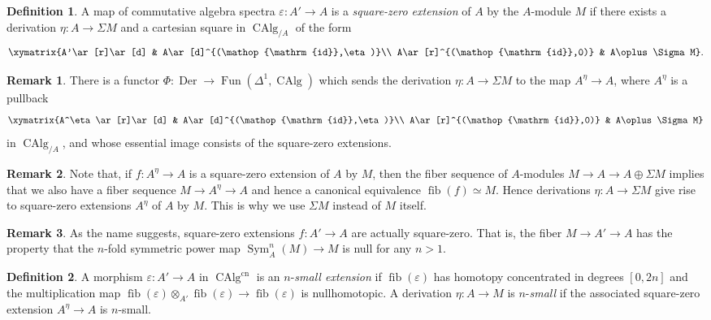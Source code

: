 \documentclass{article}
\theoremstyle{definition}
\newtheorem{definition}{Definition}[subsection]
\newtheorem{remark}{Remark}[subsection]
\DeclareMathOperator{\CAlg}{CAlg}
\DeclareMathOperator{\Der}{Der}
\DeclareMathOperator{\Fun}{Fun}
\DeclareMathOperator{\id}{id}
\DeclareMathOperator{\Sym}{Sym}
\DeclareMathOperator{\fib}{fib}
\newcommand{\cn}{\mathrm{cn}}
\renewcommand{\epsilon}{\varepsilon}
\begin{document}
\begin{definition}
A map of  commutative algebra spectra $\epsilon:A'\to A$ is a {\em square-zero extension}
of $A$ by the $A$-module $M$ if there exists a derivation $\eta:A\to\Sigma M$ and a cartesian square in $\CAlg_{/A}$ of the form
\[
\xymatrix{A'\ar[r]\ar[d] & A\ar[d]^{(\id,\eta)}\\
A\ar[r]^{(\id,0)} & A\oplus \Sigma M}.
\]
\end{definition}
\begin{remark}\label{Phi}
There is a functor $\Phi:\Der\to\Fun(\Delta^1,\CAlg)$
\index{$\Phi$}
which sends the derivation $\eta:A\to\Sigma M$ to the map $A^\eta\to A$, where $A^\eta$ is a pullback
\[
\xymatrix{A^\eta\ar[r]\ar[d] & A\ar[d]^{(\id,\eta)}\\
A\ar[r]^{(\id,0)} & A\oplus \Sigma M} 
\]
in $\CAlg_{/A}$,
and whose essential image consists of the square-zero extensions.
\end{remark}



\begin{remark}
Note that, if $f:A^\eta\to A$ is a square-zero extension of $A$ by $M$, then the fiber sequence of $A$-modules $M\to A\to A\oplus\Sigma M$ implies that we also have a fiber sequence $M\to A^\eta\to A$ and hence a canonical equivalence $\fib(f)\simeq M$.
Hence derivations $\eta:A\to\Sigma M$ give rise to square-zero extensions $A^\eta$ of $A$ by $M$.
This is why we use $\Sigma M$ instead of $M$ itself.
\end{remark}



\begin{remark}
As the name suggests, square-zero extensions $f:A'\to A$ are actually square-zero.
That is, the fiber $M\to A'\to A$ has the property that the $n$-fold symmetric power map $\Sym_A^n(M)\to M$ is null for any $n>1$.
\end{remark}

\begin{definition}
A morphism $\epsilon:A'\to A$ in $\CAlg^{\cn}$ is an $n$-{\em small extension}
if $\fib(\epsilon)$ has homotopy concentrated in degrees $[0,2n]$ and the multiplication map $\fib(\epsilon)\otimes_{A'}\fib(\epsilon)\to\fib(\epsilon)$ is nullhomotopic.
A derivation $\eta:A\to M$ is $n$-{\em small} if the associated square-zero extension $A^\eta\to A$ is $n$-small.
\end{definition}
\end{document}
